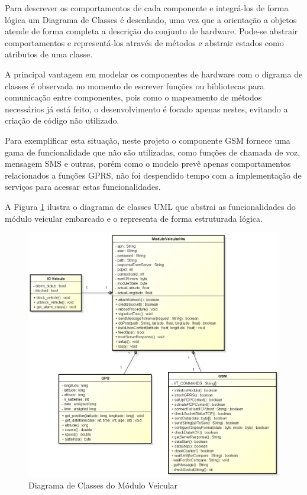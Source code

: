 Para descrever os comportamentos de cada componente e integrá-los de forma lógica um Diagrama de Classes
é desenhado, uma vez que a orientação a objetos atende de forma completa a descrição do conjunto de hardware.
Pode-se abstrair comportamentos e representá-los através de métodos e abstrair estados como atributos de uma classe. 

A principal vantagem em modelar os componentes de hardware com o digrama de classes é observada
no momento de escrever funções ou bibliotecas para comunicação entre componentes, pois como o 
mapeamento de métodos necessários já está feito, o desenvolvimento é focado apenas nestes,
evitando a criação de código não utilizado. 

Para exemplificar esta situação, neste projeto o componente GSM fornece uma gama de funcionalidade 
que não são utilizadas, como funções de chamada de voz, mensagem SMS e outras,
porém como o modelo prevê apenas comportamentos relacionados a funções GPRS,
não foi despendido tempo com a implementação de serviços para acessar estas funcionalidades. 

A Figura \ref{fig:classemodveicular} ilustra o diagrama de classes UML que abstrai as funcionalidades do módulo veicular embarcado e 
o representa de forma estruturada lógica.

\begin{figure}[!htb]
\centering
\includegraphics[width=\textwidth]{figures/5_mod_veicular.png}
\caption{Diagrama de Classes do Módulo Veicular}
\label{fig:classemodveicular}
\end{figure}

